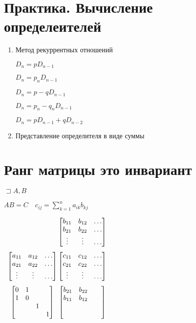 \documentclass{book}
\theoremstyle{definition}
\begin{document}
\section{Практика. Вычисление определеителей}

\begin{enumerate}
    \item Метод рекуррентных отношений

        $D_n = p D_{n-1}$

        $D_n = p_nD_{n-1}$

        $D_n = p-qD_{n-1}$

        $D_n = p_n - q_nD_{n-1}$

        $D_n = pD_{n-1} + qD_{n-2}$
    \item Представление определителя в виде суммы
\end{enumerate}

\section{Ранг матрицы это инвариант}

$\sqsupset A, B $

$AB = C\quad c_{ij} = \sum_{k=1}^{n}a_{ik}b_{kj}$

$
\begin{array}{c@{\,}c}
    &\begin{bmatrix} b_{11} & b_{12} & \ldots\\ b_{21} & b_{22} & \ldots\\ \vdots & \vdots & \ldots \end{bmatrix} \\[8mm]
    \begin{bmatrix} a_{11} & a_{12} & \ldots\\ a_{21} & a_{22} & \ldots\\ \vdots & \vdots & \ldots \end{bmatrix}    & \begin{bmatrix} c_{11} & c_{12} & \ldots\\ c_{21} & c_{22} & \ldots\\ \vdots & \vdots & \ldots \end{bmatrix} \\[8mm]
    \begin{bmatrix} 0 & 1 &  & \\ 1 & 0 & &\\ & & 1 &\\ &&&1 \end{bmatrix} & \begin{bmatrix} b_{21} & b_{22}& &\\ b_{11} & b_{12} & &\\ &&&\\&&& \end{bmatrix} 
\end{array}$
\end{document}
